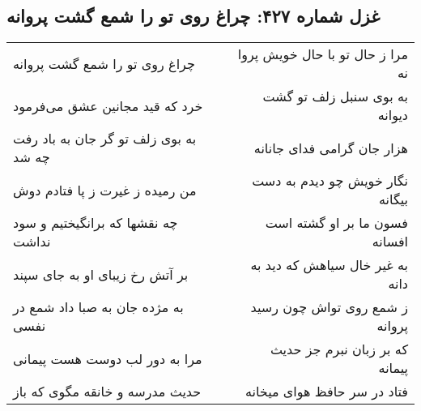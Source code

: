 \begin{center}
\section*{غزل شماره ۴۲۷: چراغ روی تو را شمع گشت پروانه}
\label{sec:sh427}
\begin{longtable}{l p{0.5cm} r}
چراغ روی تو را شمع گشت پروانه
&&
مرا ز حال تو با حال خویش پروا نه
\\
خرد که قید مجانین عشق می‌فرمود
&&
به بوی سنبل زلف تو گشت دیوانه
\\
به بوی زلف تو گر جان به باد رفت چه شد
&&
هزار جان گرامی فدای جانانه
\\
من رمیده ز غیرت ز پا فتادم دوش
&&
نگار خویش چو دیدم به دست بیگانه
\\
چه نقشها که برانگیختیم و سود نداشت
&&
فسون ما بر او گشته است افسانه
\\
بر آتش رخ زیبای او به جای سپند
&&
به غیر خال سیاهش که دید به دانه
\\
به مژده جان به صبا داد شمع در نفسی
&&
ز شمع روی تواش چون رسید پروانه
\\
مرا به دور لب دوست هست پیمانی
&&
که بر زبان نبرم جز حدیث پیمانه
\\
حدیث مدرسه و خانقه مگوی که باز
&&
فتاد در سر حافظ هوای میخانه
\\
\end{longtable}
\end{center}
